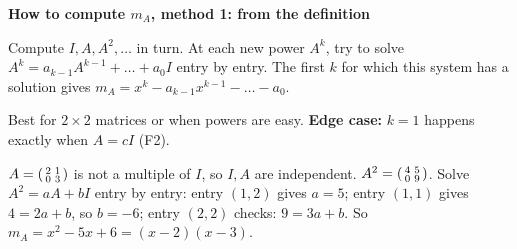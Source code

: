 \documentclass[10pt]{scrartcl}
\newenvironment{methodbox}[1]{\begin{mdframed}[style=mdbluebox,linecolor=NavyBlue,backgroundcolor=NavyBlue!3]\textbf{\color{NavyBlue}#1}\par\vspace{2pt}}{\end{mdframed}}
\begin{document}
\begin{methodbox}{How to compute $m_A$, method 1: from the definition}
\begin{enumerate}[label=\arabic*.,leftmargin=1.5em,itemsep=2pt,topsep=2pt]
  \ii Compute $I,A,A^2,\dots$ in turn.
  \ii At each new power $A^k$, try to solve $A^k=a_{k-1}A^{k-1}+\dots+a_0I$ entry by entry.
  \ii The first $k$ for which this system has a solution gives $m_A=x^k-a_{k-1}x^{k-1}-\dots-a_0$.
\end{enumerate}
Best for $2\times2$ matrices or when powers are easy. \textbf{Edge case:} $k=1$ happens exactly when $A=cI$ (F2).
\end{methodbox}
\begin{example*}
  $A=\begin{psmallmatrix}2&1\\0&3\end{psmallmatrix}$ is not a multiple of $I$, so $I,A$ are independent. $A^2=\begin{psmallmatrix}4&5\\0&9\end{psmallmatrix}$. Solve $A^2=aA+bI$ entry by entry: entry $(1,2)$ gives $a=5$; entry $(1,1)$ gives $4=2a+b$, so $b=-6$; entry $(2,2)$ checks: $9=3a+b$. So $m_A=x^2-5x+6=(x-2)(x-3)$.
\end{example*}
\end{document}
